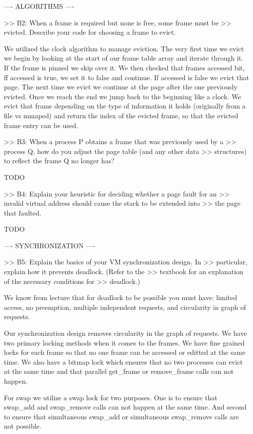 ---- ALGORITHMS ----

>> B2: When a frame is required but none is free, some frame must be
>> evicted.  Describe your code for choosing a frame to evict.

 We utilized the clock algorithm to manage eviction. The very first time
 we evict we begin by looking at the start of our frame table array and iterate
 through it. If the frame is pinned we skip over it. We then checked that frames
 accessed bit, ff accessed is true, we set it to false and continue. If
 accessed is false we evict that page. The next time we evict we continue
 at the page after the one previously evicted. Once we reach the end we jump
 back to the beginning like a clock. We evict that frame depending on the
 type of information it holds (originally from a file vs mmaped) and return
 the index of the evicted frame, so that the evicted frame entry can be used.


>> B3: When a process P obtains a frame that was previously used by a
>> process Q, how do you adjust the page table (and any other data
>> structures) to reflect the frame Q no longer has?

TODO

>> B4: Explain your heuristic for deciding whether a page fault for an
>> invalid virtual address should cause the stack to be extended into
>> the page that faulted.

TODO

---- SYNCHRONIZATION ----

>> B5: Explain the basics of your VM synchronization design.  In
>> particular, explain how it prevents deadlock.  (Refer to the
>> textbook for an explanation of the necessary conditions for
>> deadlock.)

We know from lecture that for deadlock to be possible you must have: limited 
access, no preemption, multiple independent requests, and circularity in 
graph of requests. 

Our synchronization design removes circularity in the graph of requests.
We have two primary locking methods when it comes to the frames. We have
fine grained locks for each frame so that no one frame can be accessed
or editted at the same time. We also have a bitmap lock which ensures that
no two processes can evict at the same time and that parallel get_frame
or remove_frame calls can not happen. 

For swap we utilize a swap lock for two purposes. One is to ensure that
swap_add and swap_remove calls can not happen at the same time. And second
to ensure that simultaneous swap_add or simultaneous swap_remove calls
are not possible. 

